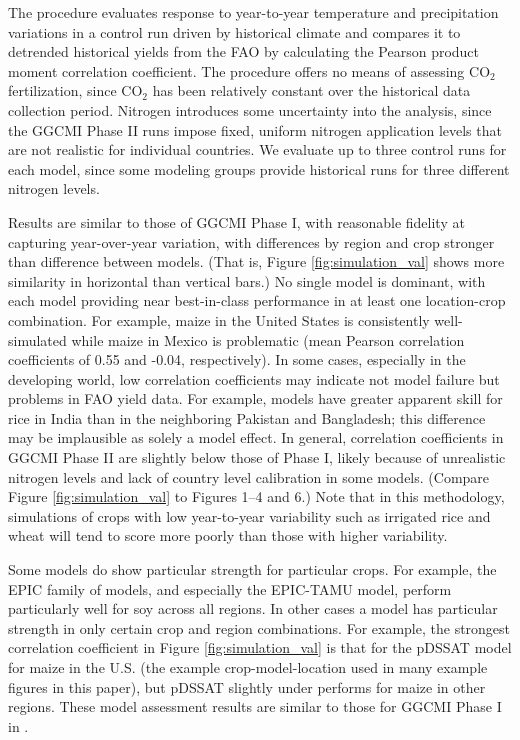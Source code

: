 \documentclass[esd, final]{copernicus} %
\begin{document}
The \citet{muller_global_2017} procedure evaluates response to year-to-year temperature and precipitation variations in a control run driven by historical climate and compares it to detrended historical yields from the FAO \citep{FAOSTAT} by calculating the Pearson product moment correlation coefficient. The procedure offers no means of assessing CO$_2$ fertilization, since CO$_2$ has been relatively constant over the historical data collection period. Nitrogen introduces some uncertainty into the analysis, since the GGCMI Phase II runs impose fixed, uniform nitrogen application levels that are not realistic for individual countries. We evaluate up to three control runs for each model, since some modeling groups provide historical runs for three different nitrogen levels. 

Results are similar to those of GGCMI Phase I, with reasonable fidelity at capturing year-over-year variation, with differences by region and crop stronger than difference between models. (That is, Figure \ref{fig:simulation_val} shows more similarity in horizontal than vertical bars.) No single model is dominant, with each model providing near best-in-class performance in at least one location-crop combination. For example, maize in the United States is consistently well-simulated while maize in Mexico is problematic (mean Pearson correlation coefficients of 0.55 and -0.04, respectively). In some cases, especially in the developing world, low correlation coefficients may indicate not model failure but problems in FAO yield data. For example, models have greater apparent skill for rice in India than in the neighboring Pakistan and Bangladesh; this difference may be implausible as solely a model effect. In general, correlation coefficients in GGCMI Phase II are slightly below those of Phase I, likely because of unrealistic nitrogen levels and lack of country level calibration in some models. (Compare Figure \ref{fig:simulation_val} to \citet{muller_global_2017} Figures 1--4 and 6.) Note that in this methodology, simulations of crops with low year-to-year variability such as irrigated rice and wheat will tend to score more poorly than those with higher variability.

Some models do show particular strength for particular crops. For example, the EPIC family of models, and especially the EPIC-TAMU model, perform particularly well for soy across all regions. In other cases a model has particular strength in only certain crop and region combinations. For example, the strongest correlation coefficient in Figure \ref{fig:simulation_val} is that for the pDSSAT model for maize in the U.S. (the example crop-model-location used in many example figures in this paper), but pDSSAT slightly under performs for maize in other regions. These model assessment results are similar to those for GGCMI Phase I in \citet{muller_global_2017}.
\end{document}

